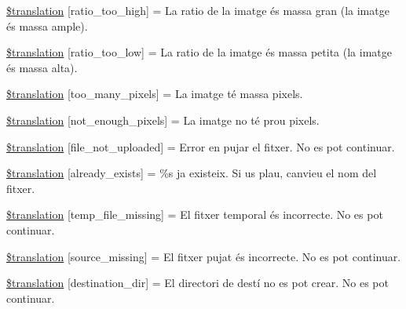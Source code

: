\begin{DoxyCompactItemize}
\hyperlink{class_8upload_8ca___c_a_8php_a23396f6ce7f31e5e5f1b57580621d982}{\$translation} \mbox{[}\textquotesingle{}ratio\+\_\+too\+\_\+high\textquotesingle{}\mbox{]} = \textquotesingle{}La ratio de la imatge és massa gran (la imatge és massa ample).\textquotesingle{}
\item 
\hyperlink{class_8upload_8ca___c_a_8php_ac533b9a479f056b0b8623e4268f068c2}{\$translation} \mbox{[}\textquotesingle{}ratio\+\_\+too\+\_\+low\textquotesingle{}\mbox{]} = \textquotesingle{}La ratio de la imatge és massa petita (la imatge és massa alta).\textquotesingle{}
\item 
\hyperlink{class_8upload_8ca___c_a_8php_aa4051ef64e94a3f8295c63cf85544016}{\$translation} \mbox{[}\textquotesingle{}too\+\_\+many\+\_\+pixels\textquotesingle{}\mbox{]} = \textquotesingle{}La imatge té massa pixels.\textquotesingle{}
\item 
\hyperlink{class_8upload_8ca___c_a_8php_a1fe342c27ce61f4ff4e0120ba647033e}{\$translation} \mbox{[}\textquotesingle{}not\+\_\+enough\+\_\+pixels\textquotesingle{}\mbox{]} = \textquotesingle{}La imatge no té prou pixels.\textquotesingle{}
\item 
\hyperlink{class_8upload_8ca___c_a_8php_a4ce76e7be0b3a03c2b47f6d70c21832e}{\$translation} \mbox{[}\textquotesingle{}file\+\_\+not\+\_\+uploaded\textquotesingle{}\mbox{]} = \textquotesingle{}Error en pujar el fitxer. No es pot continuar.\textquotesingle{}
\item 
\hyperlink{class_8upload_8ca___c_a_8php_afd84e910217f04139f567c41e292afa5}{\$translation} \mbox{[}\textquotesingle{}already\+\_\+exists\textquotesingle{}\mbox{]} = \textquotesingle{}\%s ja existeix. Si us plau, canvieu el nom del fitxer.\textquotesingle{}
\item 
\hyperlink{class_8upload_8ca___c_a_8php_ab0fa87a88aba2624004581eed0633325}{\$translation} \mbox{[}\textquotesingle{}temp\+\_\+file\+\_\+missing\textquotesingle{}\mbox{]} = \textquotesingle{}El fitxer temporal és incorrecte. No es pot continuar.\textquotesingle{}
\item 
\hyperlink{class_8upload_8ca___c_a_8php_aceaaf7355acaaf10f0ae60378d03c468}{\$translation} \mbox{[}\textquotesingle{}source\+\_\+missing\textquotesingle{}\mbox{]} = \textquotesingle{}El fitxer pujat és incorrecte. No es pot continuar.\textquotesingle{}
\item 
\hyperlink{class_8upload_8ca___c_a_8php_aff2427c72a2598aefa6d58df1dd18b08}{\$translation} \mbox{[}\textquotesingle{}destination\+\_\+dir\textquotesingle{}\mbox{]} = \textquotesingle{}El directori de destí no es pot crear. No es pot continuar.\textquotesingle{}

\end{DoxyCompactItemize}
